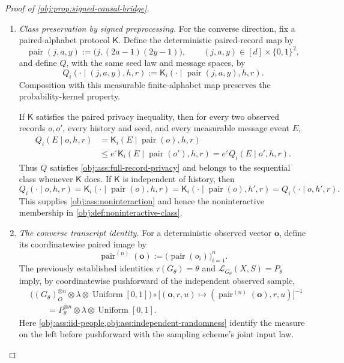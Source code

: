 \begin{proof}[Proof of \cref{obj:prop:signed-causal-bridge}]
\begin{enumerate}
\item \emph{Class preservation by signed preprocessing.}
For the converse direction, fix a paired-alphabet protocol \(\mathsf K\).
Define the deterministic paired-record map by
\[
\operatorname{pair}(j,a,y)
:=\bigl(j,(2a-1)(2y-1)\bigr),
\qquad
(j,a,y)\in[d]\times\{0,1\}^2,
\]
and define \(Q\), with the same seed law and message spaces, by
\[
Q_i(\cdot\mid(j,a,y),h,r)
:=\mathsf K_i(\cdot\mid\operatorname{pair}(j,a,y),h,r).
\]
Composition with this measurable finite-alphabet map preserves the
probability-kernel property.

If \(\mathsf K\) satisfies the paired privacy inequality, then for every
two observed records \(o,o'\), every history and seed, and every
measurable message event \(E\),
\[
\begin{aligned}
Q_i(E\mid o,h,r)
&=\mathsf K_i(E\mid\operatorname{pair}(o),h,r)\\
&\le e^\varepsilon
 \mathsf K_i(E\mid\operatorname{pair}(o'),h,r)
=e^\varepsilon Q_i(E\mid o',h,r).
\end{aligned}
\]
Thus \(Q\) satisfies \cref{obj:ass:full-record-privacy} and belongs to
the sequential class whenever \(\mathsf K\) does. If \(\mathsf K\) is
independent of history, then
\[
Q_i(\cdot\mid o,h,r)
=\mathsf K_i(\cdot\mid\operatorname{pair}(o),h,r)
=\mathsf K_i(\cdot\mid\operatorname{pair}(o),h',r)
=Q_i(\cdot\mid o,h',r).
\]
This supplies \cref{obj:ass:noninteraction} and hence the noninteractive
membership in \cref{obj:def:noninteractive-class}.

\item \emph{The converse transcript identity.}
For a deterministic observed vector \(\mathbf o\), define its
coordinatewise paired image by
\[
\operatorname{pair}^{(n)}(\mathbf o)
:=\bigl(\operatorname{pair}(o_i)\bigr)_{i=1}^n.
\]
The previously established identities
\(\tau(G_\theta)=\theta\) and
\(\mathcal L_{G_\theta}(X,S)=P_\theta\) imply, by coordinatewise
pushforward of the independent observed sample,
\[
\begin{aligned}
&\bigl((G_\theta)_O^{\otimes n}
 \otimes\lambda\otimes\operatorname{Uniform}[0,1]\bigr)
 \circ
 \bigl[(\mathbf o,r,u)
 \mapsto(\operatorname{pair}^{(n)}(\mathbf o),r,u)\bigr]^{-1}\\
&\qquad=
P_\theta^{\otimes n}\otimes\lambda
 \otimes\operatorname{Uniform}[0,1].
\end{aligned}
\]
Here \cref{obj:ass:iid-people,obj:ass:independent-randomness} identify the
measure on the left before pushforward with the sampling scheme's
joint input law.


\end{enumerate}
\end{proof}

